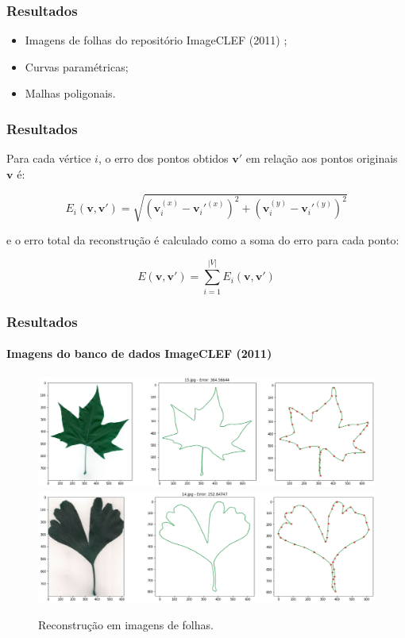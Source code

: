 \begin{frame}
\frametitle{Resultados}

\begin{itemize}
\item Imagens de folhas do repositório ImageCLEF (2011) \cite{imageclef2011};
\item Curvas paramétricas;
\item Malhas poligonais.
\end{itemize}
	
\end{frame}


\begin{frame}
\frametitle{Resultados}


\bigskip
Para cada vértice $i$, o erro dos pontos obtidos $\mathbf{v'}$ em relação aos pontos originais $\mathbf{v}$ é:

$$E_i(\mathbf{v, v'}) = \sqrt{(\mathbf v_i^{(x)} - \mathbf v_i'^{(x)})^2 + (\mathbf v_i^{(y)} - \mathbf v_i'^{(y)})^2}$$

\medskip

\noindent e o erro total da reconstrução é calculado como a soma do erro para cada ponto:

$$E(\mathbf{v, v'}) = \sum_{i = 1}^{|V|}E_i(\mathbf{v, v'})$$

\end{frame}


\begin{frame}
\frametitle{Resultados}
\framesubtitle{Imagens do banco de dados ImageCLEF (2011) \cite{imageclef2011}}
\begin{figure}[ht!]
	\centering
	\caption{Reconstrução em imagens de folhas.}
	\includegraphics[width=0.9\linewidth]{img/leaf_1.png}
	\includegraphics[width=0.9\linewidth]{img/leaf_2.png}
	\label{fig:leafs}
\end{figure}

\end{frame}


